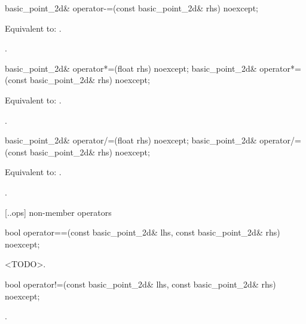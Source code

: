 %
\begin{itemdecl}
basic_point_2d& operator-=(const basic_point_2d& rhs) noexcept;
\end{itemdecl}
\begin{itemdescr}
\pnum
\effects
Equivalent to: .

\pnum
\returns
{}.
\end{itemdescr}

%
\begin{itemdecl}
basic_point_2d& operator*=(float rhs) noexcept;
basic_point_2d& operator*=(const basic_point_2d& rhs) noexcept;
\end{itemdecl}
\begin{itemdescr}
\pnum
\effects
Equivalent to: .

\pnum
\returns
{}.
\end{itemdescr}

%
\begin{itemdecl}
basic_point_2d& operator/=(float rhs) noexcept;
basic_point_2d& operator/=(const basic_point_2d& rhs) noexcept;
\end{itemdecl}
\begin{itemdescr}
\pnum
\effects
Equivalent to: .

\pnum
\returns
{}.
\end{itemdescr}

 [\iotwod.\pointtwod.ops] { non-member operators}

%
\begin{itemdecl}
bool operator==(const basic_point_2d& lhs, const basic_point_2d& rhs) noexcept;
\end{itemdecl}
\begin{itemdescr}
\pnum
\returns
<TODO>.
\end{itemdescr}

%
\begin{itemdecl}
bool operator!=(const basic_point_2d& lhs, const basic_point_2d& rhs) noexcept;
\end{itemdecl}
\begin{itemdescr}
\pnum
\returns
{}.
\end{itemdescr}


